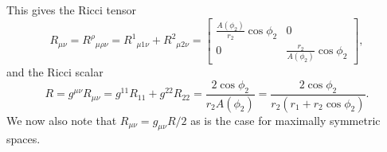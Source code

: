\documentclass[11pt,a4paper, 
swedish, english %
]{article}
\begin{document}
This gives the Ricci tensor
\begin{equation}
R_{\mu\nu}={R^\rho}_{\mu\rho\nu}={R^1}_{\mu1\nu}+{R^2}_{\mu2\nu}
=\begin{bmatrix}
\frac{A(\phi_2)}{r_2}\cos\phi_2&0\\
0&\frac{r_2}{A(\phi_2)}\cos\phi_2
\end{bmatrix},
\end{equation}
and the Ricci scalar
\begin{equation}
R=g^{\mu\nu}R_{\mu\nu}=g^{11}R_{11}+g^{22}R_{22}
=\frac{2\cos\phi_2}{r_2A(\phi_2)}
=\frac{2\cos\phi_2}{r_2(r_1+r_2\cos\phi_2)}.
\end{equation}
We now also note that $R_{\mu\nu}=g_{\mu\nu}R/2$ as is the case for
maximally symmetric spaces.

\end{document}
